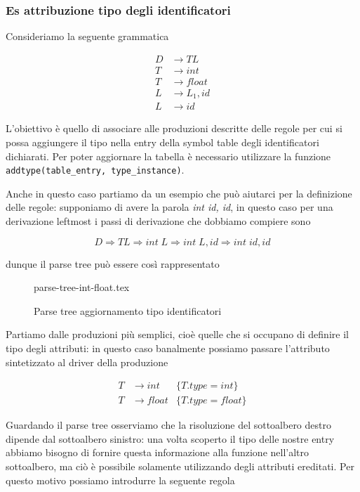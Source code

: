 \documentclass[class=book, crop=false, oneside, 12pt]{standalone}
\begin{document}
\subsubsection{Es attribuzione tipo degli identificatori}

Consideriamo la seguente grammatica

\begin{align*}
    D &\to TL \\
    T &\to int \\
    T &\to float \\
    L &\to L_1, id \\
    L &\to id
\end{align*}

L'obiettivo è quello di associare alle produzioni descritte delle regole per cui si possa aggiungere il tipo nella entry della symbol table degli identificatori dichiarati. Per poter aggiornare la tabella è necessario utilizzare la funzione \texttt{addtype(table\_entry, type\_instance)}.

Anche in questo caso partiamo da un esempio che può aiutarci per la definizione delle regole: supponiamo di avere la parola \emph{int id, id}, in questo caso per una derivazione leftmost i passi di derivazione che dobbiamo compiere sono

\begin{equation*}
    D \Rightarrow TL \Rightarrow int\; L \Rightarrow int\; L, id \Rightarrow int\; id, id
\end{equation*}

dunque il parse tree può essere così rappresentato

\begin{figure}[H]
	\centering
    {parse-tree-int-float.tex}
    \caption{Parse tree aggiornamento tipo identificatori}
    \label{fig:parse-tree-int-float}
\end{figure}

Partiamo dalle produzioni più semplici, cioè quelle che si occupano di definire il tipo degli attributi: in questo caso banalmente possiamo passare l'attributo sintetizzato al driver della produzione

\begin{align*}
    T &\to int &\{T.type = int\} \\
    T &\to float &\{T.type = float\}
\end{align*}

Guardando il parse tree osserviamo che la risoluzione del sottoalbero destro dipende dal sottoalbero sinistro: una volta scoperto il tipo delle nostre entry abbiamo bisogno di fornire questa informazione alla funzione nell'altro sottoalbero, ma ciò è possibile solamente utilizzando degli attributi ereditati. Per questo motivo possiamo introdurre la seguente regola
\end{document}
